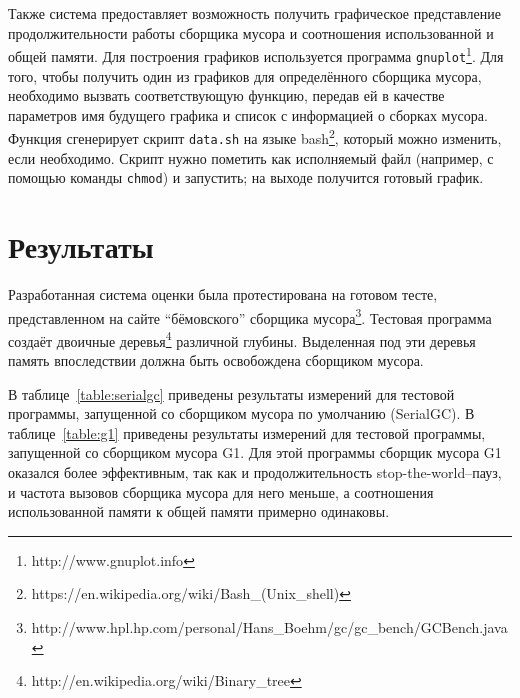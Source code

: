 Также система предоставляет возможность получить графическое представление
продолжительности работы сборщика мусора и соотношения использованной и общей 
памяти. Для построения графиков
используется программа \texttt{gnuplot}\footnote{http://www.gnuplot.info}.
Для того, чтобы получить один из графиков для определённого сборщика 
мусора, необходимо вызвать соответствующую функцию, передав ей в качестве параметров
имя будущего графика и список с информацией о сборках мусора. Функция
сгенерирует скрипт \texttt{data.sh} на языке bash\footnote{https://en.wikipedia.org/wiki/Bash\_(Unix\_shell)}, который можно изменить, если необходимо.
Скрипт нужно пометить как исполняемый файл (например,
с помощью команды \texttt{chmod}) и запустить; на выходе получится готовый график.

\section{Результаты}
Разработанная система оценки была протестирована на готовом тесте, представленном 
на сайте ``бёмовского'' сборщика мусора\footnote{http://www.hpl.hp.com/personal/Hans\_Boehm/gc/gc\_bench/GCBench.java}.
Тестовая программа создаёт двоичные деревья\footnote{http://en.wikipedia.org/wiki/Binary\_tree}
различной глубины. Выделенная под эти деревья память впоследствии должна быть освобождена сборщиком мусора.

В таблице~\ref{table:serialgc} приведены результаты измерений для тестовой программы, запущенной со сборщиком мусора по умолчанию (SerialGC).
В таблице~\ref{table:g1} приведены результаты измерений для тестовой программы, 
запущенной со сборщиком мусора G1. Для этой программы сборщик мусора G1 оказался
более эффективным, так как и продолжительность stop-the-world--пауз, и частота вызовов 
сборщика мусора для него меньше, а соотношения использованной памяти к общей памяти
примерно одинаковы.

